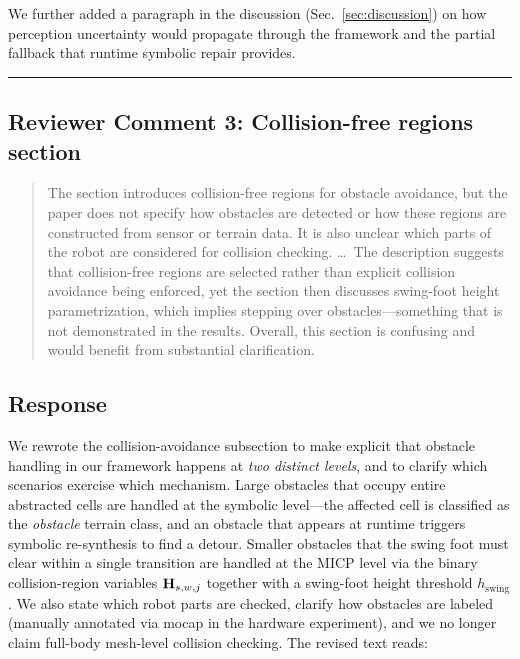 We further added a paragraph in the discussion (Sec.~\ref{sec:discussion}) on how perception uncertainty would propagate through the framework and the partial fallback that runtime symbolic repair provides.

\noindent\rule{17cm}{2.0pt}

\subsection{Reviewer Comment 3: Collision-free regions section}
\begin{mdframed}
\begin{quote}
The section introduces collision-free regions for obstacle avoidance, but the paper does not specify how obstacles are detected or how these regions are constructed from sensor or terrain data. It is also unclear which parts of the robot are considered for collision checking. \ldots\ The description suggests that collision-free regions are selected rather than explicit collision avoidance being enforced, yet the section then discusses swing-foot height parametrization, which implies stepping over obstacles---something that is not demonstrated in the results. Overall, this section is confusing and would benefit from substantial clarification.
\end{quote}
\end{mdframed}

\subsection{Response}
We rewrote the collision-avoidance subsection to make explicit that obstacle handling in our framework happens at \emph{two distinct levels}, and to clarify which scenarios exercise which mechanism. Large obstacles that occupy entire abstracted cells are handled at the symbolic level---the affected cell is classified as the \textit{obstacle} terrain class, and an obstacle that appears at runtime triggers symbolic re-synthesis to find a detour. Smaller obstacles that the swing foot must clear within a single transition are handled at the MICP level via the binary collision-region variables $\mathbf{H}_{s,w,j}$ together with a swing-foot height threshold $h_{\text{swing}}$. We also state which robot parts are checked, clarify how obstacles are labeled (manually annotated via mocap in the hardware experiment), and we no longer claim full-body mesh-level collision checking. The revised text reads:

\textit{}

